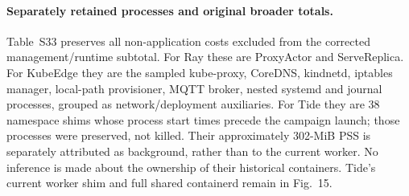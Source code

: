 \clearpage
\paragraph{Separately retained processes and original broader totals.}
Table~S33 preserves all non-application costs excluded from the corrected management/runtime subtotal. For Ray these are ProxyActor and ServeReplica. For KubeEdge they are the sampled kube-proxy, CoreDNS, kindnetd, iptables manager, local-path provisioner, MQTT broker, nested systemd and journal processes, grouped as network/deployment auxiliaries. For Tide they are 38 namespace shims whose process start times precede the campaign launch; those processes were preserved, not killed. Their approximately 302-MiB PSS is separately attributed as background, rather than to the current worker. No inference is made about the ownership of their historical containers. Tide's current worker shim and full shared containerd remain in Fig.~15.

